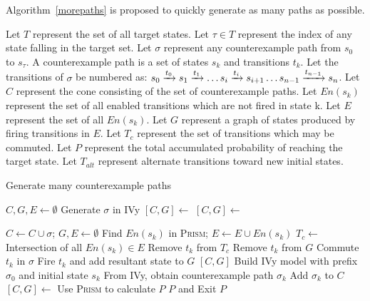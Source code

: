 Algorithm~\ref{morepaths} is proposed to quickly generate as many paths as possible.

Let $T$ represent the set of all target states.
Let $\tau \in T$ represent the index of any state falling in the target set.
Let $\sigma$ represent any counterexample path from $s_0$ to $s_\tau$.
A counterexample path is a set of states $s_k$ and transitions $t_k$.
Let the transitions of $\sigma$ be numbered as: \ensuremath{\pathFull}.
Let $C$ represent the cone consisting of the set of counterexample paths.
Let $En(s_k)$ represent the set of all enabled transitions which are not fired in state k.
Let $E$ represent the set of all $En(s_k)$.
Let $G$ represent a graph of states produced by firing transitions in $E$.
Let $T_c$ represent the set of transitions which may be commuted.
Let $P$ represent the total accumulated probability of reaching the target state.
Let $T_{alt}$ represent alternate transitions toward new initial states.

\begin{algorithm}
	\caption{Generate many counterexample paths}\label{morepaths}
	\begin{algorithmic}
		\Ensure $C,G,E \gets \emptyset$
			\State Generate $\sigma$ in IVy
			\State $[C,G] \gets $ 
				\State $[C,G] \gets$ 
			\EndWhile
			
		\EndProcedure
		\State
			\State $C \gets C \cup \sigma$; $G, E \gets \emptyset$
				\State Find $En(s_k)$ in \textsc{Prism}; $E \gets E \cup En(s_k)$
			\EndFor
			\State $T_c \gets $ Intersection of all $En(s_k) \in E$
					\State Remove $t_k$ from $T_c$
				\Else
					\State Remove $t_k$ from $G$
				\EndIf
			\EndFor
				\State Commute $t_k$ in $\sigma$
			\EndFor
				\State Fire $t_k$ and add resultant state to $G$
			\EndFor
			\State \Return $[C,G]$
		\EndProcedure
		\State
				\State Build IVy model with prefix $\sigma_0$ and initial state $s_k$
				\State From IVy, obtain counterexample path $\sigma_k$
				\State Add $\sigma_k$ to $C$
				\State $[C,G] \gets $ 
			\EndFor
		\EndProcedure
		\State 
			\State Use \textsc{Prism} to calculate $P$
				\State \Return $P$ and Exit
			\Else 
				\State \Return $P$
			\EndIf 
		\EndProcedure
	\end{algorithmic}
\end{algorithm}